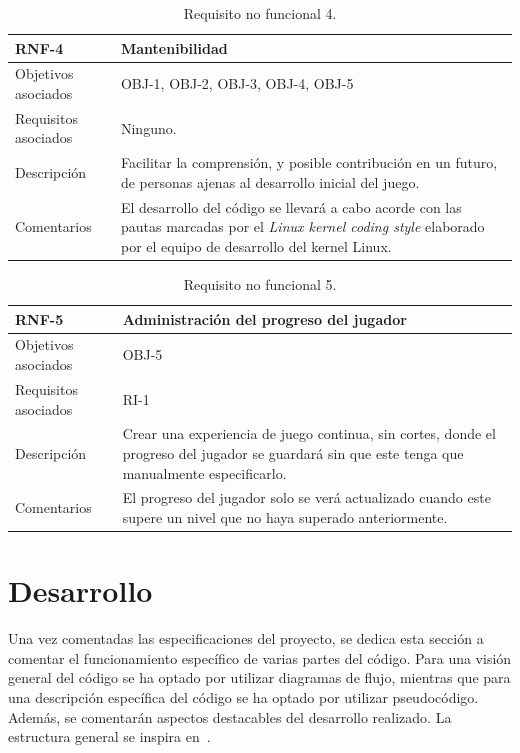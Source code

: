 \begin{table}[h]
	\centering
	\begin{tabular}{| l | p{11cm} |}
		\hline
		\textbf{RNF-4} & \textbf{Mantenibilidad} \\ \hline
		Objetivos asociados & OBJ-1, OBJ-2, OBJ-3, OBJ-4, OBJ-5 \\ \hline
		Requisitos asociados & Ninguno. \\ \hline
		Descripción & Facilitar la comprensión, y posible contribución en un futuro, de personas ajenas al desarrollo inicial del juego. \\ \hline
		Comentarios & El desarrollo del código se llevará a cabo acorde con las pautas marcadas por el \textit{Linux kernel coding style} elaborado por el equipo de desarrollo del kernel Linux. \\ \hline
	\end{tabular}
	\caption{Requisito no funcional 4.}\label{tab:rnf-4}
\end{table}
\FloatBarrier{}

\begin{table}[h]
	\centering
	\begin{tabular}{| l | p{11cm} |}
		\hline
		\textbf{RNF-5} & \textbf{Administración del progreso del jugador} \\ \hline
		Objetivos asociados & OBJ-5 \\ \hline
		Requisitos asociados & RI-1 \\ \hline
		Descripción & Crear una experiencia de juego continua, sin cortes, donde el progreso del jugador se guardará sin que este tenga que manualmente especificarlo. \\ \hline
		Comentarios & El progreso del jugador solo se verá actualizado cuando este supere un nivel que no haya superado anteriormente. \\ \hline
	\end{tabular}
	\caption{Requisito no funcional 5.}\label{tab:rnf-5}
\end{table}

\section{Desarrollo}\label{sec:aspectos}
Una vez comentadas las especificaciones del proyecto, se dedica esta sección a comentar el funcionamiento específico de varias partes del código. Para una visión general del código se ha optado por utilizar diagramas de flujo, mientras que para una descripción específica del código se ha optado por utilizar pseudocódigo. Además, se comentarán aspectos destacables del desarrollo realizado. La estructura general se inspira en~\cite{bib:ing_vid}. 

